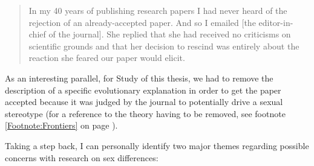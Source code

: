 \begin{quote} In my 40 years of publishing research papers I had never heard of the rejection of an already-accepted paper. And so I emailed [the editor-in-chief of the journal]. She replied that she had received no criticisms on scientific grounds and that her decision to rescind was entirely about the reaction she feared our paper would elicit. \end{quote}

As an interesting parallel, for Study  of this thesis, we had to remove the description of a specific evolutionary explanation in order to get the paper accepted because it was judged by the journal to potentially drive a sexual stereotype (for a reference to the theory having to be removed, see footnote \ref{Footnote:Frontiers} on page \pageref{Footnote:Frontiers}).

Taking a step back, I can personally identify two major themes regarding possible concerns with research on sex differences:

